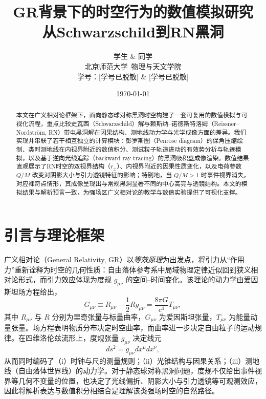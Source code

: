 \documentclass[a4paper,12pt]{article}
\title{\bfseries
GR背景下的时空行为的数值模拟研究\\[0.3em]
\large 从Schwarzschild到RN黑洞}
\author{
学生 \& 同学\\
\small 北京师范大学\ 物理与天文学院\\
\small 学号：[学号已脱敏] \& [学号已脱敏]
}
\date{\small \today}
\begin{document}
\maketitle

\thispagestyle{empty}

\begin{abstract}
本文在广义相对论框架下，面向静态球对称黑洞时空构建了一套可复用的数值模拟与可视化流程，重点比较史瓦西（Schwarzschild）解与赖斯纳--诺德斯特洛姆（Reissner--Nordström, RN）带电黑洞解在因果结构、测地线动力学与光学成像方面的差异。我们实现并串联了若干相互独立的计算模块：彭罗斯图（Penrose diagram）的保角压缩绘制、类时测地线在内视界附近的数值积分、测试粒子轨道进动的有效势分析与轨迹模拟，以及基于逆向光线追踪（backward ray tracing）的黑洞吸积盘成像渲染。数值结果直观展示了RN时空的双视界结构（$r_\pm$）、内视界附近的因果性质变化，以及电荷参数 $Q/M$ 改变对阴影大小与引力透镜特征的影响；特别地，当 $Q/M>1$ 时事件视界消失，对应裸奇点情形，其成像呈现出与常规黑洞显著不同的中心高亮与透镜结构。本文的模拟结果与解析预言一致，为强场区广义相对论的教学与数值实验提供了可视化支撑。
\end{abstract}

\newpage
\tableofcontents
\newpage

\section{引言与理论框架}

广义相对论（General Relativity, GR）以\emph{等效原理}为出发点，将引力从“作用力”重新诠释为时空的几何性质：自由落体参考系中局域物理定律近似回到狭义相对论形式，而引力效应体现为度规 $g_{\mu\nu}$ 的空间--时间变化。该理论的动力学由爱因斯坦场方程给出，
\begin{equation}
G_{\mu\nu}\equiv R_{\mu\nu}-\frac{1}{2}Rg_{\mu\nu}=\frac{8\pi G}{c^4}T_{\mu\nu},
\end{equation}
其中 $R_{\mu\nu}$ 与 $R$ 分别为里奇张量与标量曲率，$G_{\mu\nu}$ 为爱因斯坦张量，$T_{\mu\nu}$ 为能量动量张量。场方程表明物质分布决定时空曲率，而曲率进一步决定自由粒子的运动规律。在四维洛伦兹流形上，度规张量 $g_{\mu\nu}$ 决定线元
\begin{equation}
ds^2=g_{\mu\nu}dx^\mu dx^\nu,
\end{equation}
从而同时编码了（i）时钟与尺的测量规则；（ii）光锥结构与因果关系；（iii）测地线（自由落体世界线）的动力学。对于静态球对称黑洞问题，度规不仅给出事件视界等几何不变量的位置，也决定了光线偏折、阴影大小与引力透镜等可观测效应，因此将解析表达与数值积分相结合是理解该类强场时空的自然路径。
\end{document}
